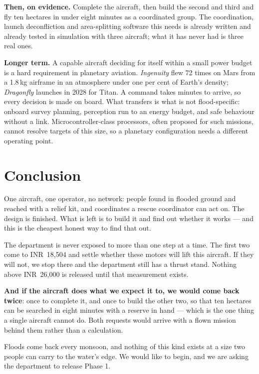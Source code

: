 \documentclass[11pt,a4paper]{article}
\newcommand{\rs}[1]{\mbox{INR~#1}}
\begin{document}
\textbf{Then, on evidence.} Complete the aircraft, then build the second and
third and fly ten hectares in under eight minutes as a coordinated group. The
coordination, launch deconfliction and area-splitting software this needs is
already written and already tested in simulation with three aircraft; what it
has never had is three real ones.

\textbf{Longer term.} A capable aircraft deciding for itself within a small
power budget is a hard requirement in planetary aviation. \emph{Ingenuity} flew
72 times on Mars from a 1.8\,kg airframe in an atmosphere under one per cent of
Earth's density; \emph{Dragonfly} launches in 2028 for Titan. A command takes
minutes to arrive, so every decision is made on board. What transfers is what is
not flood-specific: onboard survey planning, perception run to an energy budget,
and safe behaviour without a link. Microcontroller-class processors, often
proposed for such missions, cannot resolve targets of this size, so a planetary
configuration needs a different operating point.

\section{Conclusion}

One aircraft, one operator, no network: people found in flooded ground and
reached with a relief kit, and coordinates a rescue coordinator can act on. The
design is finished. What is left is to build it and find out whether it works
--- and this is the cheapest honest way to find that out.

The department is never exposed to more than one step at a time. The first two
come to \rs{18{,}504} and settle whether these motors will lift this aircraft.
If they will not, we stop there and the department still has a thrust stand.
Nothing above \rs{26{,}000} is released until that measurement exists.

\textbf{And if the aircraft does what we expect it to, we would come back
twice}: once to complete it, and once to build the other two, so that ten
hectares can be searched in eight minutes with a reserve in hand --- which is
the one thing a single aircraft cannot do. Both requests would arrive with a
flown mission behind them rather than a calculation.

Floods come back every monsoon, and nothing of this kind exists at a size two
people can carry to the water's edge. We would like to begin, and we are asking
the department to release Phase 1.


\end{document}
